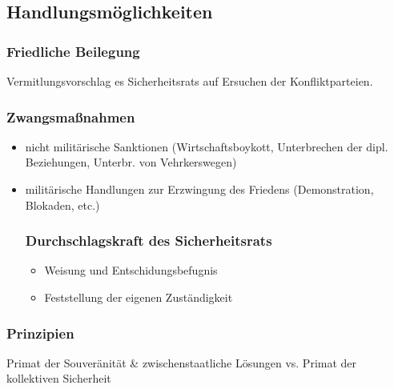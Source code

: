 \documentclass{article}
\begin{document}
\subsection*{Handlungsmöglichkeiten}
\subsubsection*{Friedliche Beilegung}
Vermitlungsvorschlag es Sicherheitsrats auf Ersuchen der Konfliktparteien.
\subsubsection*{Zwangsmaßnahmen}
\begin{itemize}
\item nicht militärische Sanktionen (Wirtschaftsboykott, Unterbrechen der dipl. Beziehungen, Unterbr. von Vehrkerswegen)
\item militärische Handlungen zur Erzwingung des Friedens (Demonstration, Blokaden, etc.)
\subsubsection*{Durchschlagskraft des Sicherheitsrats}
\begin{itemize}
    \item Weisung und Entschidungsbefugnis
    \item Feststellung der eigenen Zuständigkeit
\end{itemize} 
\end{itemize}
\subsubsection*{Prinzipien}
Primat der Souveränität \& zwischenstaatliche Lösungen vs. Primat der kollektiven Sicherheit 
\end{document}
